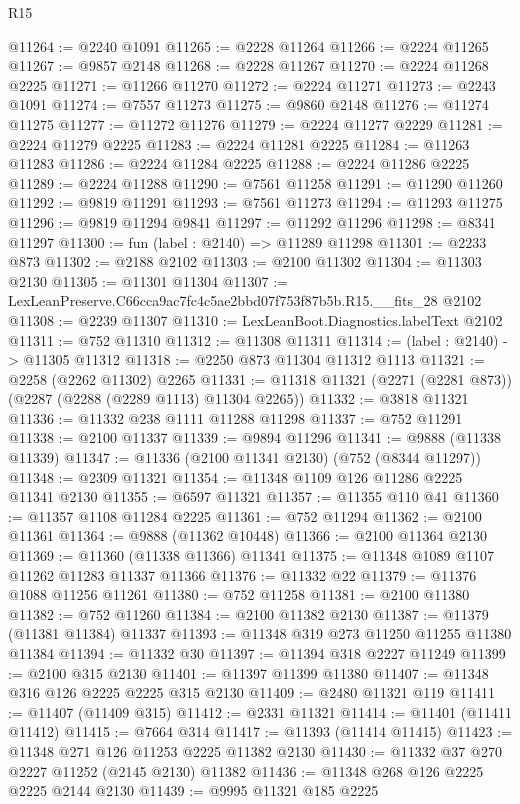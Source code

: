\begin{lexlean}{R15}
\begin{coremodule}
@11264 := @2240 @1091
@11265 := @2228 @11264
@11266 := @2224 @11265
@11267 := @9857 @2148
@11268 := @2228 @11267
@11270 := @2224 @11268 @2225
@11271 := @11266 @11270
@11272 := @2224 @11271
@11273 := @2243 @1091
@11274 := @7557 @11273
@11275 := @9860 @2148
@11276 := @11274 @11275
@11277 := @11272 @11276
@11279 := @2224 @11277 @2229
@11281 := @2224 @11279 @2225
@11283 := @2224 @11281 @2225
@11284 := @11263 @11283
@11286 := @2224 @11284 @2225
@11288 := @2224 @11286 @2225
@11289 := @2224 @11288
@11290 := @7561 @11258
@11291 := @11290 @11260
@11292 := @9819 @11291
@11293 := @7561 @11273
@11294 := @11293 @11275
@11296 := @9819 @11294 @9841
@11297 := @11292 @11296
@11298 := @8341 @11297
@11300 := fun (label : @2140) => @11289 @11298
@11301 := @2233 @873
@11302 := @2188 @2102
@11303 := @2100 @11302
@11304 := @11303 @2130
@11305 := @11301 @11304
@11307 := LexLeanPreserve.C66cca9ac7fc4c5ae2bbd07f753f87b5b.R15.__fits_28 @2102
@11308 := @2239 @11307
@11310 := LexLeanBoot.Diagnostics.labelText @2102
@11311 := @752 @11310
@11312 := @11308 @11311
@11314 := (label : @2140) -> @11305 @11312
@11318 := @2250 @873 @11304 @11312 @1113
@11321 := @2258 (@2262 @11302) @2265
@11331 := @11318 @11321 (@2271 (@2281 @873)) (@2287 (@2288 (@2289 @1113) @11304 @2265))
@11332 := @3818 @11321
@11336 := @11332 @238 @1111 @11288 @11298
@11337 := @752 @11291
@11338 := @2100 @11337
@11339 := @9894 @11296
@11341 := @9888 (@11338 @11339)
@11347 := @11336 (@2100 @11341 @2130) (@752 (@8344 @11297))
@11348 := @2309 @11321
@11354 := @11348 @1109 @126 @11286 @2225 @11341 @2130
@11355 := @6597 @11321
@11357 := @11355 @110 @41
@11360 := @11357 @1108 @11284 @2225
@11361 := @752 @11294
@11362 := @2100 @11361
@11364 := @9888 (@11362 @10448)
@11366 := @2100 @11364 @2130
@11369 := @11360 (@11338 @11366) @11341
@11375 := @11348 @1089 @1107 @11262 @11283 @11337 @11366
@11376 := @11332 @22
@11379 := @11376 @1088 @11256 @11261
@11380 := @752 @11258
@11381 := @2100 @11380
@11382 := @752 @11260
@11384 := @2100 @11382 @2130
@11387 := @11379 (@11381 @11384) @11337
@11393 := @11348 @319 @273 @11250 @11255 @11380 @11384
@11394 := @11332 @30
@11397 := @11394 @318 @2227 @11249
@11399 := @2100 @315 @2130
@11401 := @11397 @11399 @11380
@11407 := @11348 @316 @126 @2225 @2225 @315 @2130
@11409 := @2480 @11321 @119
@11411 := @11407 (@11409 @315)
@11412 := @2331 @11321
@11414 := @11401 (@11411 @11412)
@11415 := @7664 @314
@11417 := @11393 (@11414 @11415)
@11423 := @11348 @271 @126 @11253 @2225 @11382 @2130
@11430 := @11332 @37 @270 @2227 @11252 (@2145 @2130) @11382
@11436 := @11348 @268 @126 @2225 @2225 @2144 @2130
@11439 := @9995 @11321 @185 @2225

\end{coremodule}
\end{lexlean}
